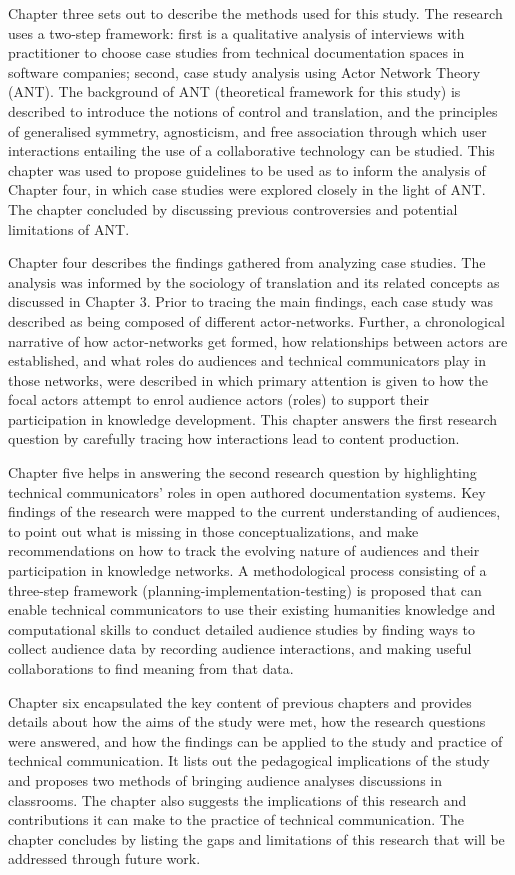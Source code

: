 Chapter three sets out to describe the methods used for this study. The research uses a two-step framework: first is a qualitative analysis of interviews with practitioner to choose case studies from technical documentation spaces in software companies; second, case study analysis using Actor Network Theory (ANT). The background of ANT (theoretical framework for this study) is described to introduce the notions of control and translation, and the principles of generalised symmetry, agnosticism, and free association through which user interactions entailing the use of a collaborative technology can be studied. This chapter was used to propose guidelines to be used as to inform the analysis of Chapter four, in which case studies were explored closely in the light of ANT. The chapter concluded by discussing previous controversies and potential limitations of ANT.

Chapter four describes the findings gathered from analyzing case studies. The analysis was informed by the sociology of translation and its related concepts as discussed in Chapter 3. Prior to tracing the main findings, each case study was described as being composed of different actor-networks. Further, a chronological narrative of how actor-networks get formed, how relationships between actors are established, and what roles do audiences and technical communicators play in those networks, were described in which primary attention is given to how the focal actors attempt to enrol audience actors (roles) to support their participation in knowledge development. This chapter answers the first research question by carefully tracing how interactions lead to content production. 

Chapter five helps in answering the second research question by highlighting technical communicators' roles in open authored documentation systems. Key findings of the research were mapped to the current understanding of audiences, to point out what is missing in those conceptualizations, and make recommendations on how to track the evolving nature of audiences and their participation in knowledge networks. A methodological process consisting of a three-step framework (planning-implementation-testing) is proposed that can enable technical communicators to use their existing humanities knowledge and computational skills to conduct detailed audience studies by finding ways to collect audience data by recording audience interactions, and making useful collaborations to find meaning from that data.

Chapter six encapsulated the key content of previous chapters and provides details about how the aims of the study were met, how the research questions were answered, and how the findings can be applied to the study and practice of technical communication. It lists out the pedagogical implications of the study and proposes two methods of bringing audience analyses discussions in classrooms. The chapter also suggests the implications of this research and contributions it can make to the practice of technical communication. The chapter concludes by listing the gaps and limitations of this research that will be addressed through future work. 
